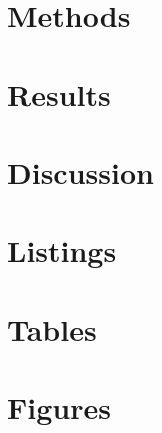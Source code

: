%
%
\section{Methods}


%
%
\section{Results}


%
%
\section{Discussion}

\newpage

%
% 


\newpage

%
%
\begin{appendix}
  \section{Listings} 
  
  
  \section{Tables}
  

  \section{Figures}
  


\end{appendix}

